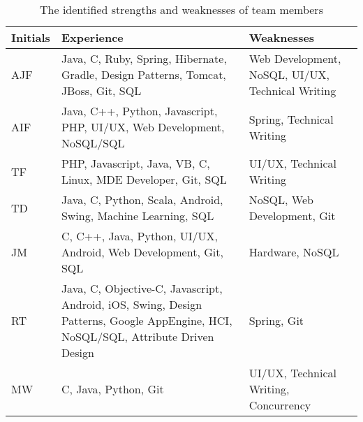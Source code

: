 \begin{table}[H]
\centering
\begin{tabular}{|p{1.2cm}|p{8cm}|p{5cm}|}
  \hline \rowcolor{titleColor}\textbf{Initials} &
  \textbf{Experience} &
  \textbf{Weaknesses}\\

  \hline AJF
  & Java, C, Ruby, Spring, Hibernate, Gradle, Design Patterns, Tomcat, JBoss,
  Git, SQL
  & Web Development, NoSQL, UI/UX, Technical Writing \\

  \hline AIF
  & Java, C++, Python, Javascript, PHP, UI/UX, Web Development, NoSQL/SQL
  & Spring, Technical Writing \\
  
  \hline TF
  & PHP, Javascript, Java, VB, C, Linux, MDE Developer, Git, SQL
  & UI/UX, Technical Writing \\

  \hline TD
  & Java, C, Python, Scala, Android, Swing, Machine Learning, SQL
  & NoSQL, Web Development, Git \\

  \hline JM
  & C, C++, Java, Python, UI/UX, Android, Web Development, Git, SQL
  & Hardware, NoSQL \\

  \hline RT
  & Java, C, Objective-C, Javascript, Android, iOS, Swing, Design Patterns,
  Google AppEngine, HCI, NoSQL/SQL, Attribute Driven Design
  & Spring, Git \\

  \hline MW
  & C, Java, Python, Git
  & UI/UX, Technical Writing, Concurrency \\
  \hline
\end{tabular}
\caption{The identified strengths and weaknesses of team members}
\label{tab:skills}
\end{table}

